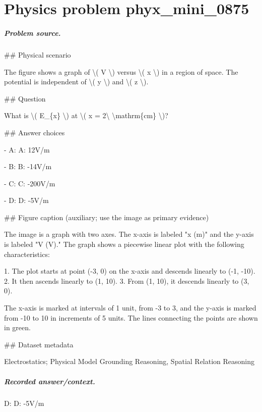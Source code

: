 
\chapter{Physics problem phyx\_mini\_0875}
\label{ch:PhyXMiniProblems_problem_phyx_mini_0875}

\paragraph{Problem source.}
\#\# Physical scenario

The figure shows a graph of \textbackslash{}( V \textbackslash{}) versus \textbackslash{}( x \textbackslash{}) in a region of space. The potential is independent of \textbackslash{}( y \textbackslash{}) and \textbackslash{}( z \textbackslash{}).

\#\# Question

What is \textbackslash{}( E\_\{x\} \textbackslash{}) at \textbackslash{}( x = 2\textbackslash{} \textbackslash{}mathrm\{cm\} \textbackslash{})?

\#\# Answer choices

- A: A: 12V/m

- B: B: -14V/m

- C: C: -200V/m

- D: D: -5V/m

\#\# Figure caption (auxiliary; use the image as primary evidence)

The image is a graph with two axes. The x-axis is labeled "x (m)" and the y-axis is labeled "V (V)." The graph shows a piecewise linear plot with the following characteristics:

1. The plot starts at point (-3, 0) on the x-axis and descends linearly to (-1, -10).
2. It then ascends linearly to (1, 10).
3. From (1, 10), it descends linearly to (3, 0).

The x-axis is marked at intervals of 1 unit, from -3 to 3, and the y-axis is marked from -10 to 10 in increments of 5 units. The lines connecting the points are shown in green.

\#\# Dataset metadata

Electrostatics; Physical Model Grounding Reasoning, Spatial Relation Reasoning

\paragraph{Recorded answer/context.}
D: D: -5V/m

